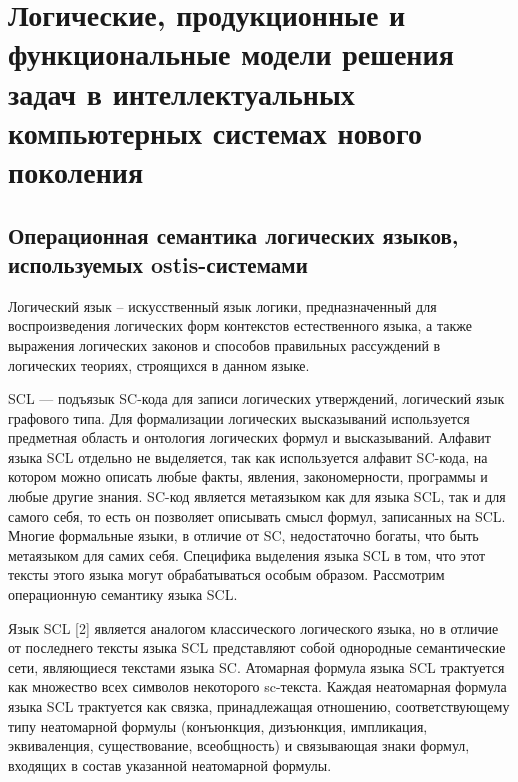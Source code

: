 \chapter{Логические, продукционные и функциональные модели решения задач в интеллектуальных компьютерных системах нового поколения}
\label{chapter_logic_productions}


\section{Операционная семантика логических языков, используемых ostis-системами}

Логический язык -- искусственный язык логики, предназначенный для воспроизведения логических форм контекстов естественного языка, а также выражения логических законов и способов правильных рассуждений в логических теориях, строящихся в данном языке.

SCL — подъязык SC-кода для записи логических утверждений, логический язык графового типа. Для формализации логических высказываний используется предметная область и онтология логических формул и высказываний. Алфавит языка SCL отдельно не выделяется, так как используется алфавит SC-кода, на котором можно описать любые факты, явления, закономерности, программы и любые другие знания. SC-код является метаязыком как для языка SCL, так и для самого себя, то есть он позволяет описывать смысл формул, записанных на SCL. Многие формальные языки, в отличие от SC, недостаточно богаты, что быть метаязыком для самих себя. Специфика выделения языка SCL в том, что этот тексты этого языка могут обрабатываться особым образом. Рассмотрим операционную семантику языка SCL. 

Язык SCL [2] является аналогом классического логического языка, но в отличие от последнего тексты языка SCL представляют собой однородные семантические сети, являющиеся текстами языка SC. Атомарная формула языка SCL трактуется как множество всех символов некоторого sc-текста. Каждая неатомарная формула языка SCL трактуется как связка, принадлежащая отношению, соответствующему типу неатомарной формулы (конъюнкция, дизъюнкция, импликация, эквиваленция, существование, всеобщность) и связывающая знаки формул, входящих в состав указанной неатомарной формулы.

